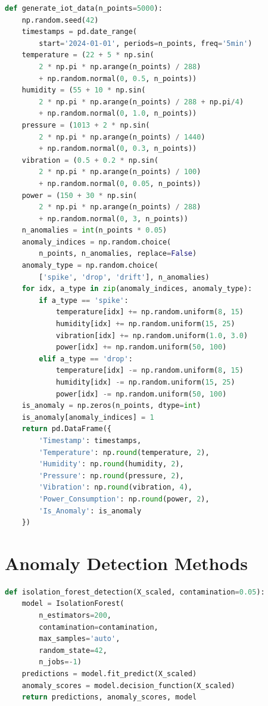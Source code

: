 \documentclass[12pt,a4paper]{report}
\begin{document}
\begin{lstlisting}[language=Python, caption={Synthetic IoT data generator}]
def generate_iot_data(n_points=5000):
    np.random.seed(42)
    timestamps = pd.date_range(
        start='2024-01-01', periods=n_points, freq='5min')
    temperature = (22 + 5 * np.sin(
        2 * np.pi * np.arange(n_points) / 288)
        + np.random.normal(0, 0.5, n_points))
    humidity = (55 + 10 * np.sin(
        2 * np.pi * np.arange(n_points) / 288 + np.pi/4)
        + np.random.normal(0, 1.0, n_points))
    pressure = (1013 + 2 * np.sin(
        2 * np.pi * np.arange(n_points) / 1440)
        + np.random.normal(0, 0.3, n_points))
    vibration = (0.5 + 0.2 * np.sin(
        2 * np.pi * np.arange(n_points) / 100)
        + np.random.normal(0, 0.05, n_points))
    power = (150 + 30 * np.sin(
        2 * np.pi * np.arange(n_points) / 288)
        + np.random.normal(0, 3, n_points))
    n_anomalies = int(n_points * 0.05)
    anomaly_indices = np.random.choice(
        n_points, n_anomalies, replace=False)
    anomaly_type = np.random.choice(
        ['spike', 'drop', 'drift'], n_anomalies)
    for idx, a_type in zip(anomaly_indices, anomaly_type):
        if a_type == 'spike':
            temperature[idx] += np.random.uniform(8, 15)
            humidity[idx] += np.random.uniform(15, 25)
            vibration[idx] += np.random.uniform(1.0, 3.0)
            power[idx] += np.random.uniform(50, 100)
        elif a_type == 'drop':
            temperature[idx] -= np.random.uniform(8, 15)
            humidity[idx] -= np.random.uniform(15, 25)
            power[idx] -= np.random.uniform(50, 100)
    is_anomaly = np.zeros(n_points, dtype=int)
    is_anomaly[anomaly_indices] = 1
    return pd.DataFrame({
        'Timestamp': timestamps,
        'Temperature': np.round(temperature, 2),
        'Humidity': np.round(humidity, 2),
        'Pressure': np.round(pressure, 2),
        'Vibration': np.round(vibration, 4),
        'Power_Consumption': np.round(power, 2),
        'Is_Anomaly': is_anomaly
    })
\end{lstlisting}

\section{Anomaly Detection Methods}
\begin{lstlisting}[language=Python, caption={Isolation Forest implementation}]
def isolation_forest_detection(X_scaled, contamination=0.05):
    model = IsolationForest(
        n_estimators=200,
        contamination=contamination,
        max_samples='auto',
        random_state=42,
        n_jobs=-1)
    predictions = model.fit_predict(X_scaled)
    anomaly_scores = model.decision_function(X_scaled)
    return predictions, anomaly_scores, model
\end{lstlisting}
\end{document}
